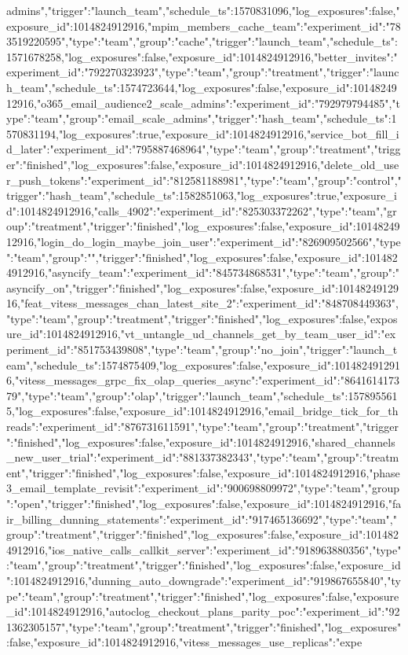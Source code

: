 {admins","trigger":"launch_team","schedule_ts":1570831096,"log_exposures":false,"exposure_id":1014824912916},"mpim_members_cache_team":{"experiment_id":"783519220595","type":"team","group":"cache","trigger":"launch_team","schedule_ts":1571678258,"log_exposures":false,"exposure_id":1014824912916},"better_invites":{"experiment_id":"792270323923","type":"team","group":"treatment","trigger":"launch_team","schedule_ts":1574723644,"log_exposures":false,"exposure_id":1014824912916},"o365_email_audience2_scale_admins":{"experiment_id":"792979794485","type":"team","group":"email_scale_admins","trigger":"hash_team","schedule_ts":1570831194,"log_exposures":true,"exposure_id":1014824912916},"service_bot_fill_id_later":{"experiment_id":"795887468964","type":"team","group":"treatment","trigger":"finished","log_exposures":false,"exposure_id":1014824912916},"delete_old_user_push_tokens":{"experiment_id":"812581188981","type":"team","group":"control","trigger":"hash_team","schedule_ts":1582851063,"log_exposures":true,"exposure_id":1014824912916},"calls_4902":{"experiment_id":"825303372262","type":"team","group":"treatment","trigger":"finished","log_exposures":false,"exposure_id":1014824912916},"login_do_login_maybe_join_user":{"experiment_id":"826909502566","type":"team","group":"","trigger":"finished","log_exposures":false,"exposure_id":1014824912916},"asyncify_team":{"experiment_id":"845734868531","type":"team","group":"asyncify_on","trigger":"finished","log_exposures":false,"exposure_id":1014824912916},"feat_vitess_messages_chan_latest_site_2":{"experiment_id":"848708449363","type":"team","group":"treatment","trigger":"finished","log_exposures":false,"exposure_id":1014824912916},"vt_untangle_ud_channels_get_by_team_user_id":{"experiment_id":"851753439808","type":"team","group":"no_join","trigger":"launch_team","schedule_ts":1574875409,"log_exposures":false,"exposure_id":1014824912916},"vitess_messages_grpc_fix_olap_queries_async":{"experiment_id":"864161417379","type":"team","group":"olap","trigger":"launch_team","schedule_ts":1578955615,"log_exposures":false,"exposure_id":1014824912916},"email_bridge_tick_for_threads":{"experiment_id":"876731611591","type":"team","group":"treatment","trigger":"finished","log_exposures":false,"exposure_id":1014824912916},"shared_channels_new_user_trial":{"experiment_id":"881337382343","type":"team","group":"treatment","trigger":"finished","log_exposures":false,"exposure_id":1014824912916},"phase3_email_template_revisit":{"experiment_id":"900698809972","type":"team","group":"open","trigger":"finished","log_exposures":false,"exposure_id":1014824912916},"fair_billing_dunning_statements":{"experiment_id":"917465136692","type":"team","group":"treatment","trigger":"finished","log_exposures":false,"exposure_id":1014824912916},"ios_native_calls_callkit_server":{"experiment_id":"918963880356","type":"team","group":"treatment","trigger":"finished","log_exposures":false,"exposure_id":1014824912916},"dunning_auto_downgrade":{"experiment_id":"919867655840","type":"team","group":"treatment","trigger":"finished","log_exposures":false,"exposure_id":1014824912916},"autoclog_checkout_plans_parity_poc":{"experiment_id":"921362305157","type":"team","group":"treatment","trigger":"finished","log_exposures":false,"exposure_id":1014824912916},"vitess_messages_use_replicas":{"expe}
